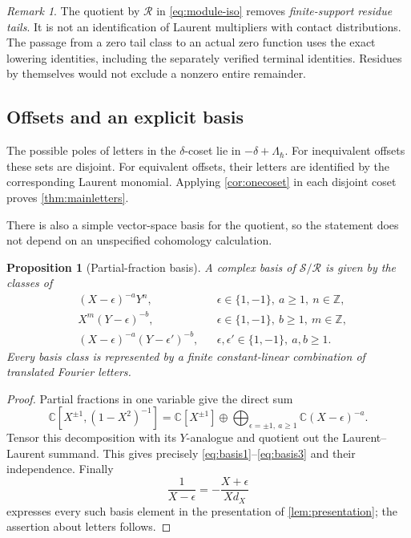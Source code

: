 \documentclass[11pt]{article}
\numberwithin{equation}{section}
\newtheorem{proposition}[proposition]{Proposition}
\theoremstyle{definition}
\theoremstyle{remark}
\newtheorem{remark}[remark]{Remark}
\newcommand{\C}{\mathbb C}
\newcommand{\Z}{\mathbb Z}
\newcommand{\calR}{\mathcal R}
\newcommand{\calS}{\mathcal S}
\newcommand{\qh}{\hbar}
\begin{document}
\begin{remark}\label{rem:notcontact}
The quotient by $\calR$ in \eqref{eq:module-iso} removes \emph{finite-support
residue tails}. It is not an identification of Laurent multipliers with
contact distributions. The passage from a zero tail class to an actual zero
function uses the exact lowering identities, including the separately verified
terminal identities. Residues by themselves would not exclude a nonzero
entire remainder.
\end{remark}

\subsection{Offsets and an explicit basis}

The possible poles of letters in the $\delta$-coset lie in
$-\delta+\Lambda_{\qh}$. For inequivalent offsets these sets are disjoint.
For equivalent offsets, their letters are identified by the corresponding
Laurent monomial. Applying \cref{cor:onecoset} in each disjoint coset proves
\cref{thm:mainletters}.

There is also a simple vector-space basis for the quotient, so the statement
does not depend on an unspecified cohomology calculation.

\begin{proposition}[Partial-fraction basis]\label{prop:basis}
A complex basis of $\calS/\calR$ is given by the classes of
\begin{align}
 &(X-\epsilon)^{-a}Y^n,
 &&\epsilon\in\{1,-1\},\ a\geq1,\ n\in\Z,\label{eq:basis1}\\
 &X^m(Y-\epsilon)^{-b},
 &&\epsilon\in\{1,-1\},\ b\geq1,\ m\in\Z,\label{eq:basis2}\\
 &(X-\epsilon)^{-a}(Y-\epsilon')^{-b},
 &&\epsilon,\epsilon'\in\{1,-1\},\ a,b\geq1.\label{eq:basis3}
\end{align}
Every basis class is represented by a finite constant-linear combination of
translated Fourier letters.
\end{proposition}
\begin{proof}
Partial fractions in one variable give the direct sum
\[
 \C[X^{\pm1},(1-X^2)^{-1}]
 =\C[X^{\pm1}]
 \oplus\bigoplus_{\epsilon=\pm1,\ a\geq1}\C(X-\epsilon)^{-a}.
\]
Tensor this decomposition with its $Y$-analogue and quotient out the
Laurent--Laurent summand. This gives precisely
\eqref{eq:basis1}--\eqref{eq:basis3} and their independence.
Finally
\[
 \frac1{X-\epsilon}=-\frac{X+\epsilon}{Xd_X}
\]
expresses every such basis element in the presentation of
\cref{lem:presentation}; the assertion about letters follows.
\end{proof}
\end{document}
